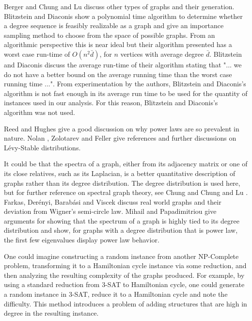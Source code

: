 \documentclass[twoside,11pt]{article}
\begin{document}
 Berger \citeyear{berger_pa} and Chung and Lu \citeyear{chung_complex} discuss other types of graphs and their generation.
Blitzstein and Diaconis \citeyear{diaconis} show a polynomial
time algorithm to determine whether a degree sequence is feasibly realizable as a graph and give an importance sampling method to choose
from the space of possible graphs.  From an algorithmic perspective this is near ideal but their
algorithm presented has a worst case run-time of $O(n^2 \bar{d})$, for
$n$ vertices with average degree $\bar{d}$.  Blitzstein and Diaconis discuss the average run-time of
their algorithm stating that "... we do not have a better bound on the average running time than the worst case running time ...".
From experimentation by the authors, Blitzstein and Diaconis's algorithm is not fast enough in its average run time to be used for
the quantity of instances used in our analysis.
For this reason, Blitzstein and Diaconis's algorithm was not used.

Reed and Hughes \citeyear{reed} give a good discussion on why power laws are so prevalent in nature.
Nolan \citeyear{nolan}, Zolotarev \citeyear{zolotarev}
and Feller \citeyear{feller} give references and further discussions on L\'evy-Stable distributions.

It could be that the spectra of a graph, either from its adjacency matrix or one of its close relatives, such as its Laplacian, is
a better quantitative description of graphs rather than its degree distribution.  
The degree distribution is used here, but
for further reference on spectral graph theory, see Chung \citeyear{chung_spec} and Chung and Lu \citeyear{chung_complex}.
Farkas, Der\'enyi, Barab\'asi and Viscek \citeyear{farkas} discuss real world graphs and their deviation from Wigner's semi-circle law.
Mihail and Papadimitriou \citeyear{mihail_papadimitriou} give arguments for showing that the spectrum of a graph is highly
tied to its degree distribution and show, for graphs with a degree distribution that is power law, the first few eigenvalues
display power law behavior.

One could imagine constructing a random instance from another NP-Complete problem, transforming it to a Hamiltonian cycle instance via
some reduction, and then analyzing the resulting complexity of the graphs produced.  For example, by using a standard reduction from
3-SAT to Hamiltonian cycle, one could generate a random instance in 3-SAT, reduce it to a Hamiltonian cycle and note the difficulty.
This method introduces a problem of adding structures that are high in degree in the resulting instance.
\end{document}
